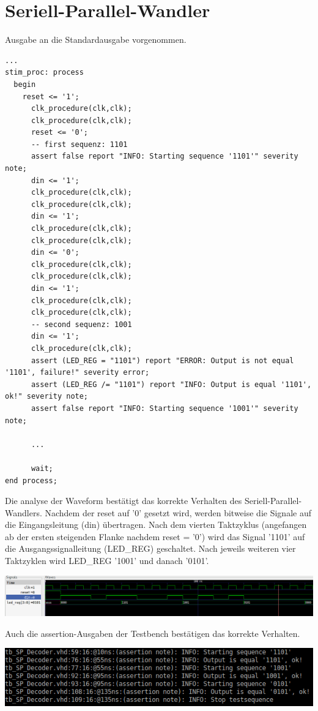 \documentclass{article}
\newcommand{\perlscript}[2]{
\begin{itemize}
\item[]
\end{itemize}
}
\newcommand{\enterProblemHeader}[1]{
}
\newcommand{\exitProblemHeader}[1]{
}
\newcounter{homeworkProblemCounter} %
\newcommand{\homeworkProblemName}{}
\newenvironment{homeworkProblem}[1][Problem \arabic{homeworkProblemCounter}]{ %
\stepcounter{homeworkProblemCounter} %
\renewcommand{\homeworkProblemName}{#1} %
\section{\homeworkProblemName} %
\enterProblemHeader{\homeworkProblemName} %
}{
\exitProblemHeader{\homeworkProblemName} %
}
\begin{document}
\begin{homeworkProblem}[Seriell-Parallel-Wandler]
Ausgabe an die Standardausgabe vorgenommen.
\begin{verbatim}
...
stim_proc: process
  begin
    reset <= '1';
      clk_procedure(clk,clk);
      clk_procedure(clk,clk);
      reset <= '0';
      -- first sequenz: 1101
      assert false report "INFO: Starting sequence '1101'" severity note;
      din <= '1';
      clk_procedure(clk,clk);
      clk_procedure(clk,clk);
      din <= '1';
      clk_procedure(clk,clk);
      clk_procedure(clk,clk);
      din <= '0';
      clk_procedure(clk,clk);
      clk_procedure(clk,clk);
      din <= '1';
      clk_procedure(clk,clk);
      clk_procedure(clk,clk);
      -- second sequenz: 1001
      din <= '1';
      clk_procedure(clk,clk);
      assert (LED_REG = "1101") report "ERROR: Output is not equal '1101', failure!" severity error;
      assert (LED_REG /= "1101") report "INFO: Output is equal '1101', ok!" severity note;
      assert false report "INFO: Starting sequence '1001'" severity note;
		
      ...
		
      wait;
end process;
\end{verbatim}
Die analyse der Waveform bestätigt das korrekte Verhalten des Seriell-Parallel-Wandlers. Nachdem der reset auf '0' gesetzt wird, werden bitweise die Signale
auf die Eingangsleitung (din) übertragen. Nach dem vierten Taktzyklus (angefangen ab der ersten steigenden Flanke nachdem reset = '0') wird das Signal '1101' auf die Ausgangssignalleitung
(LED\_REG) geschaltet. Nach jeweils weiteren vier Taktzyklen wird LED\_REG '1001' und danach '0101'. 
\begin{center}
\includegraphics[width=1\columnwidth]{SP_Sim}
\end{center}
Auch die assertion-Ausgaben der Testbench bestätigen das korrekte Verhalten.
\begin{center}
\includegraphics[width=0.5\columnwidth]{Output}
\end{center}
\end{homeworkProblem}

\end{document}
